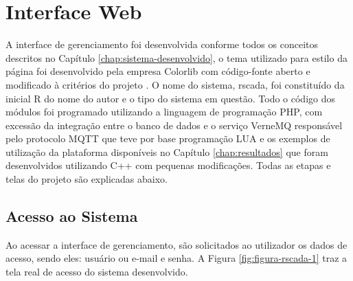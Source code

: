 \chapter{Interface Web}
\label{chap:interface-web}

A interface de gerenciamento foi desenvolvida conforme todos os conceitos descritos no Capítulo \ref{chap:sistema-desenvolvido}, o tema utilizado para estilo da página foi desenvolvido pela empresa Colorlib com código-fonte aberto e modificado à critérios do projeto \cite{Concept}. O nome do sistema, rscada,  foi constituído da inicial R do nome do autor e o tipo do sistema em questão. Todo o código dos módulos foi programado utilizando a linguagem de programação PHP, com excessão da integração entre o banco de dados e o serviço VerneMQ responsável pelo protocolo MQTT que teve por base programação LUA e os exemplos de utilização da plataforma disponíveis no Capítulo \ref{chap:resultados} que foram desenvolvidos utilizando C++ com pequenas modificações. Todas as etapas e telas do projeto são explicadas abaixo.

\section{Acesso ao Sistema}
\label{sec:acesso-sistema}
Ao acessar a interface de gerenciamento, são solicitados ao utilizador os dados de acesso, sendo eles: usuário ou e-mail e senha. A Figura \ref{fig:figura-rscada-1} traz a tela real de acesso do sistema desenvolvido.

        \begin{figure}[!h]
    	\end{figure}

